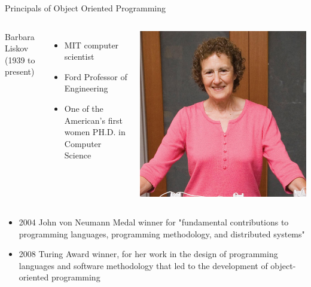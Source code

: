 \begin{frame}{Principals of Object Oriented Programming}
\begin{columns}
Barbara Liskov (1939 to present)
\begin{itemize}
	\item MIT computer scientist
	\item Ford Professor of Engineering
	\item One of the American's first women PH.D. in Computer Science
\end{itemize}

	\vspace{-.15in}\hspace{-.18in}
	\includegraphics[scale=0.08]{fig/barbara-liskov}

\end{columns}
\begin{itemize}
	\item 2004 John von Neumann Medal winner for "fundamental contributions to programming languages, programming methodology, and distributed systems"
	\item 2008 Turing Award winner, for her work in the design of programming languages and software methodology that led to the development of object-oriented programming
\end{itemize}
\end{frame}

